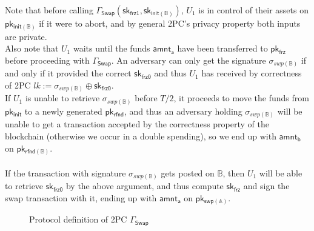 \documentclass{article}      	%
\begin{document}
Note that before calling $\Gamma_{\mathsf{Swap}}(\mathsf{sk_{frz1}}, \mathsf{sk_{init(\mathbb{B})}})$, $U_1$ is in control of their assets on $\mathsf{pk_{init(\mathbb{B})}}$ if it were to abort, and by general 2PC's privacy property both inputs are private. \\
Also note that $U_1$ waits until the funds $\mathsf{amnt_a}$ have been transferred to $\mathsf{pk_{frz}}$ before proceeding with  $\Gamma_{\mathsf{Swap}}$.
An adversary can only get the signature $\sigma_{swp(\mathbb{B})}$ if and only if it provided the correct $\mathsf{sk_{frz0}}$ and thus $U_1$ has received by correctness of 2PC $lk := \sigma_{swp(\mathbb{B})} \oplus \mathsf{sk_{frz0}}$. \\
If $U_1$ is unable to retrieve $\sigma_{swp(\mathbb{B})}$ before $T/2$, it proceeds to move the funds from $\mathsf{pk_{init}}$ to a newly generated $\mathsf{pk_{rfnd}}$, and thus an adversary holding $\sigma_{swp(\mathbb{B})}$ will be unable to get a transaction accepted by the correctness property of the blockchain (otherwise we occur in a double spending), so we end up with  $\mathsf{amnt_b}$ on $\mathsf{pk_{rfnd(\mathbb{B})}}$. \\
\\
If the transaction with signature $\sigma_{swp(\mathbb{B})}$ gets posted on $\mathbb{B}$, then $U_1$ will be able to retrieve $\mathsf{sk_{frz0}}$ by the above argument, and thus compute $\mathsf{sk_{frz}}$ and sign the swap transaction with it, ending up with $\mathsf{amnt_a}$ on $\mathsf{pk_{swp(\mathbb{A})}}$.

\newpage
\begin{figure}[H]
\begin{pchstack}

\end{pchstack}
\caption{Protocol definition of 2PC $\Gamma_{\mathsf{Swap}}$}
\end{figure}
\end{document}
